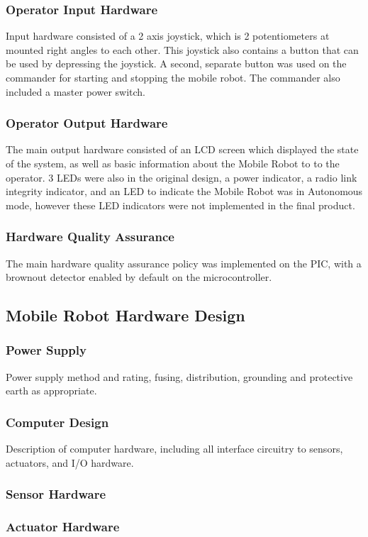 \documentclass[MTRX3700report.tex]{subfiles}
\begin{document}
    \subsubsection{Operator Input Hardware}
    Input hardware consisted of a 2 axis joystick, which is 2 potentiometers at mounted right angles to each other. This joystick also contains a button that can be used by depressing the joystick. A second, separate button was used on the commander for starting and stopping the mobile robot. The commander also included a master power switch.
    \subsubsection{Operator Output Hardware}
    The main output hardware consisted of an LCD screen which displayed the state of the system, as well as basic information about the Mobile Robot to to the operator. 3 LEDs were also in the original design, a power indicator, a radio link integrity indicator, and an LED to indicate the Mobile Robot was in Autonomous mode, however these LED indicators were not implemented in the final product.
    \subsubsection{Hardware Quality Assurance}
    The main hardware quality assurance policy was implemented on the PIC, with a brownout detector enabled by default on the microcontroller.

  \subsection{Mobile Robot Hardware Design}
    \subsubsection{Power Supply}
    Power supply method and rating, fusing, distribution, grounding and protective earth as appropriate.
    \subsubsection{Computer Design}
    Description of computer hardware, including all interface circuitry to sensors, actuators, and I/O hardware.
    \subsubsection{Sensor Hardware}
    \subsubsection{Actuator Hardware}
\end{document}

